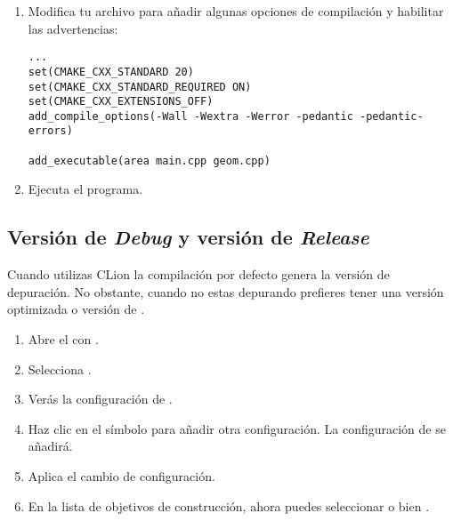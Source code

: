 \begin{enumerate}
\begin{lstlisting}
int main() {
  double x = 2.0;
  double y = 3.0;
  std::cout << "area(" << x << "," << y << ")= " << geom::area(x,y) << "\n";
}
\end{lstlisting}

\item
Modifica tu archivo  para añadir algunas opciones de compilación y 
habilitar las advertencias:

\begin{lstlisting}
...
set(CMAKE_CXX_STANDARD 20)
set(CMAKE_CXX_STANDARD_REQUIRED ON)
set(CMAKE_CXX_EXTENSIONS_OFF)
add_compile_options(-Wall -Wextra -Werror -pedantic -pedantic-errors)

add_executable(area main.cpp geom.cpp)
\end{lstlisting}

\item
Ejecuta el programa.

\end{enumerate}

\subsection{Versión de \emph{Debug} y versión de \emph{Release}}

Cuando utilizas CLion la compilación por defecto genera la versión de depuración.
No obstante, cuando no estas depurando prefieres tener una versión optimizada o versión de .

\begin{enumerate}

\item
Abre el  con .

\item
Selecciona .

\item 
Verás la configuración de .

\item 
Haz clic en el símbolo \textmark{+} 
para añadir otra configuración.
La configuración de  se añadirá.

\item
Aplica el cambio de configuración.

\item
En la lista de objetivos de construcción, ahora puedes seleccionar 
 o bien .

\end{enumerate}


